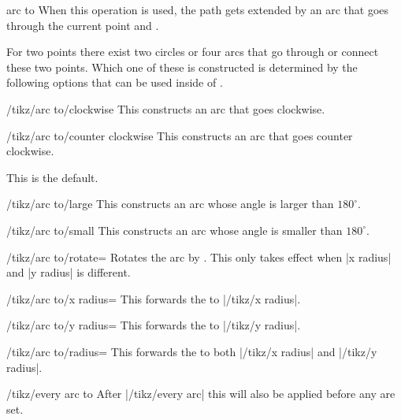 \begin{pathoperation}{arc to}{}
When this operation is used, the path gets extended by an arc that goes through
the current point and .

For two points there exist two circles or four arcs that go through or connect
these two points. Which one of these is constructed is determined by the following
options that can be used inside of .

\begin{stylekey}{/tikz/arc to/clockwise}
  This constructs an arc that goes clockwise.
\end{stylekey}

\begin{stylekey}{/tikz/arc to/counter clockwise}
  This constructs an arc that goes counter clockwise.
  
  This is the default.
\end{stylekey}

\begin{stylekey}{/tikz/arc to/large}
  This constructs an arc whose angle is larger than $180^\circ$.
\end{stylekey}

\begin{stylekey}{/tikz/arc to/small}
  This constructs an arc whose angle is smaller than $180^\circ$.
\end{stylekey}

\begin{key}{/tikz/arc to/rotate=}
  Rotates the arc by .
  This only takes effect when |x radius| and |y radius| is different.
\end{key}

\begin{key}{/tikz/arc to/x radius=}
  This forwards the  to |/tikz/x radius|.
\end{key}

\begin{key}{/tikz/arc to/y radius=}
  This forwards the  to |/tikz/y radius|.
\end{key}

\begin{key}{/tikz/arc to/radius=}
  This forwards the  to both |/tikz/x radius| and |/tikz/y radius|.
\end{key}

\begin{stylekey}{/tikz/every arc to}
  After |/tikz/every arc| this will also be applied before any  are set.
\end{stylekey}


\end{pathoperation}
